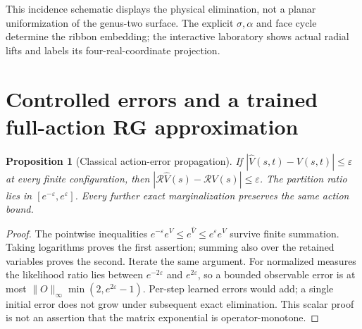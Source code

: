 \documentclass[11pt,oneside,openany]{book}
\newtheorem{proposition}[theorem]{Proposition}
\theoremstyle{definition}\newtheorem{definition}[theorem]{Definition}
\theoremstyle{remark}\newtheorem{remark}[theorem]{Remark}
\begin{document}
\begin{center}
\end{center}
This incidence schematic displays the physical elimination, not a planar
uniformization of the genus-two surface. The explicit $\sigma,\alpha $ and
face cycle determine the ribbon embedding; the interactive laboratory
shows actual radial lifts and labels its four-real-coordinate projection.
\section{Controlled errors and a trained full-action RG approximation}
\label{sec:rg-details}
\begin{proposition}[Classical action-error propagation]
If $|\widehat V(s,t)-V(s,t)|\le\varepsilon $ at every finite configuration,
then $|\mathcal R\widehat V(s)-\mathcal RV(s)|\le\varepsilon $.
The partition ratio lies in $[e^{-\varepsilon},e^{\varepsilon}]$.
Every further \emph{exact} marginalization preserves the same action bound.
\end{proposition}
\begin{proof}
The pointwise inequalities
$ e^{-\varepsilon}e^V\le e^{\widehat V}\le e^\varepsilon e^V $
survive finite summation. Taking logarithms proves the first assertion;
summing also over the retained variables proves the second. Iterate the
same argument. For normalized measures the likelihood ratio lies between
$ e^{-2\varepsilon}$ and $ e^{2\varepsilon}$, so a bounded observable error
is at most $\|O\|_\infty\min(2,e^{2\varepsilon}-1)$. Per-step learned
errors would add; a single initial error does not grow under subsequent
exact elimination. This scalar proof is not an assertion that the matrix
exponential is operator-monotone.
\end{proof}
\end{document}
